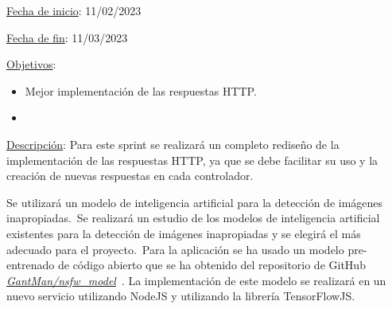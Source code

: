 
\underline{Fecha de inicio}: 11/02/2023

\underline{Fecha de fin}: 11/03/2023

\underline{Objetivos}:
\begin{itemize}
	\item Mejor implementación de las respuestas HTTP\@.
	\item {}
\end{itemize}

\underline{Descripción}:
Para este sprint se realizará un completo rediseño de la implementación de las respuestas HTTP, ya que se debe
facilitar su uso y la creación de nuevas respuestas en cada controlador.

Se utilizará un modelo de inteligencia artificial para la detección de imágenes inapropiadas.\ Se realizará un
estudio de los modelos de inteligencia artificial existentes para la detección de imágenes inapropiadas y se elegirá
el más adecuado para el proyecto.\ Para la aplicación se ha usado un modelo pre-entrenado de código abierto que se ha
obtenido del repositorio de GitHub
\href{https://github.com/GantMan/nsfw_model}{\textit{GantMan/nsfw\_model}}~\cite{nsfw-model-repo}.
La implementación de este modelo se realizará en un nuevo servicio utilizando NodeJS y utilizando la librería
TensorFlowJS\@.
